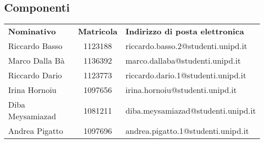 \subsection{Componenti}
\begin{table}[H]
	\centering\renewcommand{\arraystretch}{1.5}
	
	\begin{tabular}{l c l}
		
		
		\rowcolorhead 
		{ \textbf{Nominativo}} &
		{ \textbf{Matricola}} &
		{ \textbf{Indirizzo di posta elettronica}}  \\
		
		\rowcolorlight
		Riccardo Basso & 1123188 & riccardo.basso.2@studenti.unipd.it  \\ 
		\rowcolordark
		Marco Dalla Bà & 1136392 & marco.dallaba@studenti.unipd.it  \\ 
		\rowcolorlight
		Riccardo Dario & 1123773 & riccardo.dario.1@studenti.unipd.it  \\ 
		\rowcolordark
		Irina Hornoiu & 1097656 &  irina.hornoiu@studenti.unipd.it \\ 
		\rowcolorlight
		Diba Meysamiazad & 1081211 & diba.meysamiazad@studenti.unipd.it  \\ 
		\rowcolordark
		Andrea Pigatto & 1097696  & andrea.pigatto.1@studenti.unipd.it  \\ 
	\end{tabular}
\end{table}

